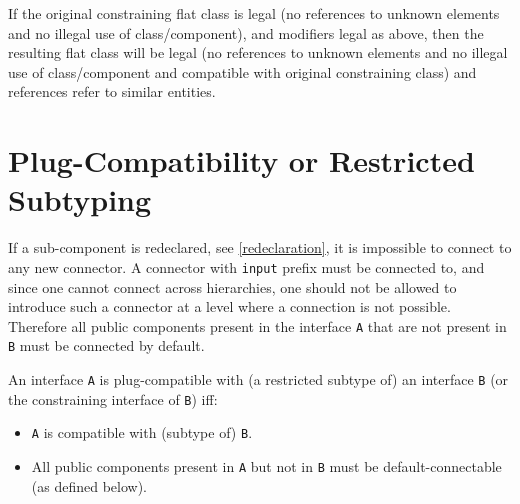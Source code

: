 \begin{nonnormative}
If the original constraining flat class is legal (no references to unknown elements and no illegal use of class/component), and modifiers legal as above, then the resulting flat class will be legal
(no references to unknown elements and no illegal use of class/component and compatible with original constraining class) and references refer to similar entities.
\end{nonnormative}

\section{Plug-Compatibility or Restricted Subtyping}\label{plug-compatibility-or-restricted-subtyping}

\begin{nonnormative}
If a sub-component is redeclared, see \cref{redeclaration}, it is impossible to connect to any new connector.  A connector with \lstinline!input! prefix must be connected to, and since one cannot connect across hierarchies, one should not be allowed to introduce such a connector at a level where a connection is not possible.  Therefore all public components present in the interface \lstinline!A! that are not present in \lstinline!B! must be connected by default.
\end{nonnormative}

\begin{definition}[Plug-compatibility (= restricted subtyping)]
An interface \lstinline!A! is plug-compatible with (a restricted subtype of) an
interface \lstinline!B! (or the constraining interface of \lstinline!B!) iff:
\begin{itemize}
\item
  \lstinline!A! is compatible with (subtype of) \lstinline!B!.
\item
  All public components present in \lstinline!A! but not in \lstinline!B! must be
  default-connectable (as defined below).
\end{itemize}
\end{definition}

